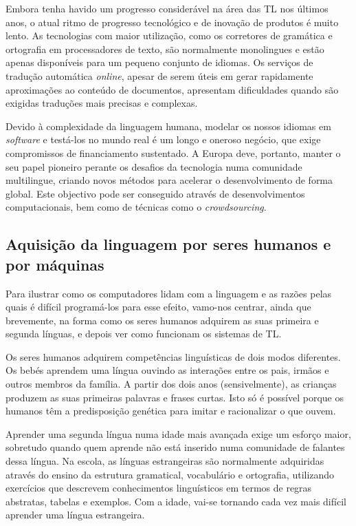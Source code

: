 \documentclass[]{../metanetpaper}
\begin{document}
\begin{multicols}{2}
 Embora tenha havido um progresso considerável na área das TL nos últimos anos, o atual ritmo de progresso tecnológico e de inovação de produtos é muito lento. As tecnologias com maior utilização, como os corretores de gramática e ortografia em processadores de texto, são normalmente monolingues e estão apenas disponíveis para um pequeno conjunto de idiomas. Os serviços de tradução automática \textit{online}, apesar de serem úteis em gerar rapidamente aproximações ao conteúdo de documentos, apresentam dificuldades quando são exigidas traduções mais precisas e complexas. 


Devido à complexidade da linguagem humana, modelar os nossos idiomas em \textit{software} e testá-los no mundo real é um longo e oneroso negócio, que exige compromissos de financiamento sustentado. A Europa deve, portanto, manter o seu papel pioneiro perante os desafios da tecnologia numa comunidade multilingue, criando novos métodos para acelerar o desenvolvimento de forma global. Este objectivo pode ser conseguido através de desenvolvimentos computacionais, bem como de técnicas como o \textit{crowdsourcing}.

\subsection{Aquisição da linguagem por seres humanos e por máquinas}

 Para ilustrar como os computadores lidam com a linguagem e as razões pelas quais é difícil pro\-gra\-má-los para esse efeito, vamo-nos centrar, ainda que brevemente, na forma como os seres humanos adquirem as suas primeira e segunda línguas, e depois ver como funcionam os sistemas de TL.

Os seres humanos adquirem competências linguísticas de dois modos diferentes. Os bebés aprendem uma língua ouvindo as interações entre os pais, irmãos e outros membros da família. A partir dos dois anos (sensivelmente), as crianças produzem as suas primeiras palavras e frases curtas. Isto só é possível porque os humanos têm a predisposição genética para imitar e racionalizar o que ouvem.


Aprender uma segunda língua numa idade mais avançada exige um esforço maior, sobretudo quando quem aprende não está inserido numa comunidade de falantes dessa língua. Na escola, as línguas estrangeiras são normalmente adquiridas através do ensino da estrutura gramatical, vocabulário e ortografia, utilizando exercícios que descrevem conhecimentos linguísticos em termos de regras abstratas, tabelas e exemplos. Com a idade, vai-se tornando cada vez mais difícil aprender uma língua estrangeira.


\end{multicols}
\end{document}
